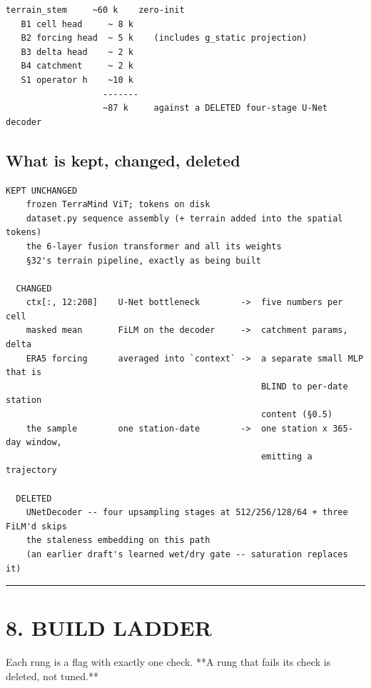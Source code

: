 \documentclass[10pt,a4paper]{article}
\begin{document}
\begin{Verbatim}[fontsize=\scriptsize,frame=leftline,framerule=0.6pt,rulecolor=\color{rulegray},xleftmargin=6pt,framesep=6pt,]
   terrain_stem     ~60 k    zero-init
   B1 cell head     ~ 8 k
   B2 forcing head  ~ 5 k    (includes g_static projection)
   B3 delta head    ~ 2 k
   B4 catchment     ~ 2 k
   S1 operator h    ~10 k
                   -------
                   ~87 k     against a DELETED four-stage U-Net decoder
\end{Verbatim}

\subsection*{What is kept, changed, deleted}

\begin{Verbatim}[fontsize=\scriptsize,frame=leftline,framerule=0.6pt,rulecolor=\color{rulegray},xleftmargin=6pt,framesep=6pt,]
  KEPT UNCHANGED
    frozen TerraMind ViT; tokens on disk
    dataset.py sequence assembly (+ terrain added into the spatial tokens)
    the 6-layer fusion transformer and all its weights
    §32's terrain pipeline, exactly as being built

  CHANGED
    ctx[:, 12:208]    U-Net bottleneck        ->  five numbers per cell
    masked mean       FiLM on the decoder     ->  catchment params, delta
    ERA5 forcing      averaged into `context` ->  a separate small MLP that is
                                                  BLIND to per-date station
                                                  content (§0.5)
    the sample        one station-date        ->  one station x 365-day window,
                                                  emitting a trajectory

  DELETED
    UNetDecoder -- four upsampling stages at 512/256/128/64 + three FiLM'd skips
    the staleness embedding on this path
    (an earlier draft's learned wet/dry gate -- saturation replaces it)
\end{Verbatim}

\medskip\hrule\medskip

\section*{8. BUILD LADDER}

Each rung is a flag with exactly one check. **A rung that fails its check is
deleted, not tuned.**
\end{document}
